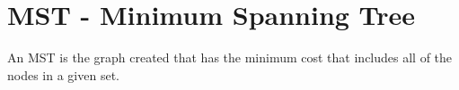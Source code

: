 \section*{MST - Minimum Spanning Tree}

An MST is the graph created that has the minimum cost that includes all of the nodes in a given set.

